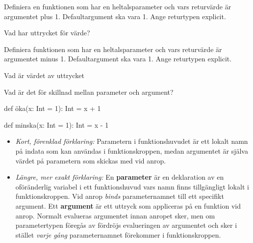 \Subtask Definiera en funktionen  som har en heltalsparameter  och vars returvärde är argumentet plus 1. Defaultargument ska vara 1. Ange returtypen explicit.

\Subtask Vad har uttrycket  för värde?

\Subtask Definiera funktionen  som har en heltalsparameter  och vars returvärde är argumentet minus 1. Defaultargument ska vara 1. Ange returtypen explicit.

\Subtask Vad är värdet av uttrycket 

\Subtask Vad är det för skillnad mellan parameter och argument?

\SOLUTION

\TaskSolved \what

\SubtaskSolved
\begin{Code}
def öka(x: Int = 1): Int = x + 1
\end{Code}

\SubtaskSolved  {}

\SubtaskSolved
\begin{Code}
def minska(x: Int = 1): Int = x - 1
\end{Code}

\SubtaskSolved  {}

\SubtaskSolved
\begin{itemize}
  \item \emph{Kort, förenklad förklaring:} Parametern i funktionshuvudet är ett lokalt namn på indata som kan användas i funktionskroppen, medan argumentet är själva värdet på parametern som skickas med vid anrop.
  \item \emph{Längre, mer exakt förklaring:} En \textbf{parameter} är en deklaration av en oföränderlig variabel i ett funktionshuvud vars namn finns tillgängligt lokalt i funktionskroppen. Vid anrop \emph{binds} parameternamnet till ett specifikt argument. Ett \textbf{argument} är ett uttryck som  appliceras på en funktion vid anrop. Normalt evalueras argumentet innan anropet sker, men om parametertypen föregås av \code{=>} fördröjs evalueringen av argumentet och sker i stället \emph{varje gång} parameternamnet förekommer i funktionskroppen.
\end{itemize}

\QUESTEND





\QUESTBEGIN

